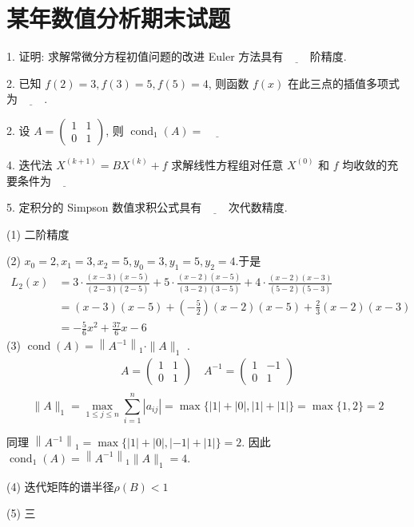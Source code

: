 \newpage
\section{某年数值分析期末试题}
\begin{tcolorbox}[breakable,
		colframe=white!10!jingga, coltitle=white!90!jingga, colback=white!95!jingga, coltext=black, colbacktitle=white!10!jingga, enhanced, fonttitle=\bfseries,fontupper=\normalsize, attach boxed title to top left={yshift=-2mm}, before skip=8pt, after skip=8pt,
		title=填空题]
 

1. 证明: 求解常微分方程初值问题的改进 Euler 方法具有$\underline{\hspace{1cm}}$阶精度.
    
2. 已知 $ f(2)=3, f(3)=5, f(5)=4 $, 则函数 $ f(x) $ 在此三点的插值多项式为$\underline{\hspace{1cm}}$.

2. 设 $ A=\left(\begin{array}{ll}1 & 1 \\ 0 & 1\end{array}\right) $, 则 $ \operatorname{cond}_{1}(A)= \underline{\hspace{1cm}}$

4. 迭代法 $ X^{(k+1)}=B X^{(k)}+f $ 求解线性方程组对任意 $ X^{(0)} $ 和 $ f $ 均收敛的充要条件为$\underline{\hspace{1cm}}$

5. 定积分的 Simpson 数值求积公式具有$\underline{\hspace{1cm}}$次代数精度.

 \tcblower

(1) 二阶精度

(2) $x_{0}  =2, x_{1}=3, x_{2}=5 , y_{0}  =3, y_{1}=5, y_{2}=4 $.于是
$$
\begin{aligned}
L_{2}(x) & =3 \cdot \frac{(x-3)(x-5)}{(2-3)(2-5)}+5 \cdot \frac{(x-2)(x-5)}{(3-2)(3-5)}+4 \cdot \frac{(x-2)(x-3)}{(5-2)(5-3)} \\
& =(x-3)(x-5)+(-\frac{5}{2})(x-2)(x-5)+\frac{2}{3}(x-2)(x-3) \\
& =-\frac{5}{6} x^{2}+\frac{37}{6} x-6
\end{aligned}
$$
(3) $\operatorname{cond}(A)=\left\|A^{-1}\right\|_{1} \cdot\|A\|_{1}$ .
$$
\begin{array}{l}
A=\left(\begin{array}{ll}
1 & 1 \\
0 & 1
\end{array}\right) \quad A^{-1}=\left(\begin{array}{cc}
1 & -1 \\
0 & 1
\end{array}\right) \\
\end{array}
$$
$$\|A\|_{1}=\max _{1 \leqslant j \leqslant n} \sum_{i=1}^{n}\left|a_{i j}\right|=\max \{|1|+|0|,|1|+|1|\} 
=\max \{1,2\}=2 $$

同理 $ \left\|A^{-1}\right\|_{1}=\max \{|1|+|0|,|-1|+|1|\}=2 $.
因此 $ \operatorname{cond}_{1}(A)=\left\|A^{-1}\right\|_{1}\|A\|_{1}=4 $.

(4) 迭代矩阵的谱半径$\rho(B)<1$

(5) 三
\end{tcolorbox}


